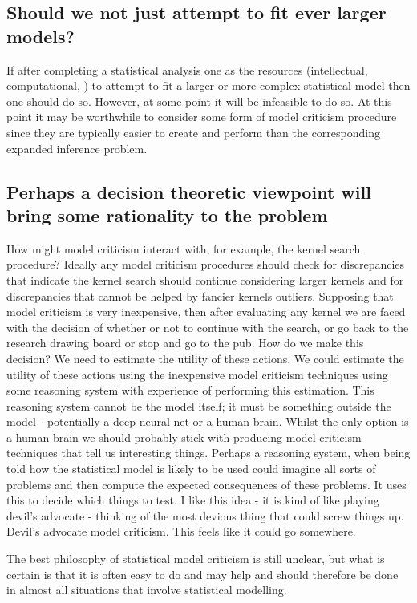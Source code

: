 
\subsection{Should we not just attempt to fit ever larger models?}

If after completing a statistical analysis one as the resources (intellectual, computational, \etc) to attempt to fit a larger or more complex statistical model then one should do so.
However, at some point it will be infeasible to do so.
At this point it may be worthwhile to consider some form of model criticism procedure since they are typically easier to create and perform than the corresponding expanded inference problem.

\subsection{Perhaps a decision theoretic viewpoint will bring some rationality to the problem}

How might model criticism interact with, for example, the kernel search procedure?
Ideally any model criticism procedures should check for discrepancies that indicate the kernel search should continue considering larger kernels and for discrepancies that cannot be helped by fancier kernels \eg outliers.
Supposing that model criticism is very inexpensive, then after evaluating any kernel we are faced with the decision of whether or not to continue with the search, or go back to the research drawing board or stop and go to the pub.
How do we make this decision?
We need to estimate the utility of these actions.
We could estimate the utility of these actions using the inexpensive model criticism techniques using some reasoning system with experience of performing this estimation.
This reasoning system cannot be the model itself; it must be something outside the model - potentially a deep neural net or a human brain.
Whilst the only option is a human brain we should probably stick with producing model criticism techniques that tell us interesting things.
Perhaps a reasoning system, when being told how the statistical model is likely to be used could imagine all sorts of problems and then compute the expected consequences of these problems.
It uses this to decide which things to test.
I like this idea - it is kind of like playing devil's advocate - thinking of the most devious thing that could screw things up.
Devil's advocate model criticism.
This feels like it could go somewhere.

The best philosophy of statistical model criticism is still unclear, but what is certain is that it is often easy to do and may help and should therefore be done in almost all situations that involve statistical modelling.

\outbpdocument{


}
